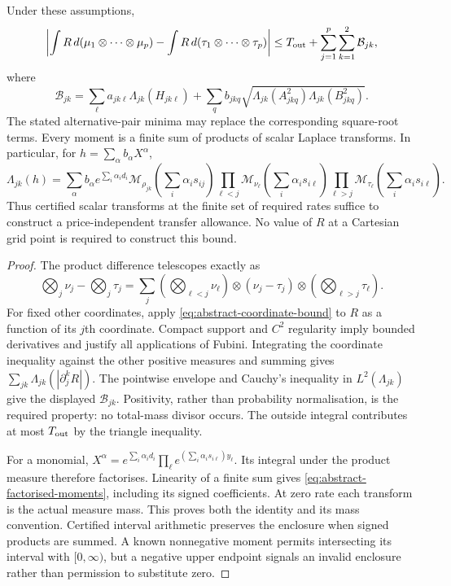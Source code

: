 \begin{proposition}
\label{prop:abstract-transfer-reduction}
Under these assumptions,
\[
 \left|\int R\,d(\mu_1\otimes\cdots\otimes\mu_p)
       -\int R\,d(\tau_1\otimes\cdots\otimes\tau_p)\right|
 \leq T_{\rm out}+\sum_{j=1}^p\sum_{k=1}^2 \mathcal B_{jk},
\]
where
\[
 \mathcal B_{jk}=
 \sum_\ell a_{jk\ell}\Lambda_{jk}(H_{jk\ell})
 +\sum_q b_{jkq}
     \sqrt{\Lambda_{jk}(A_{jkq}^2)\Lambda_{jk}(B_{jkq}^2)}.
\]
The stated alternative-pair minima may replace the corresponding
square-root terms. Every moment is a finite sum of products of scalar
Laplace transforms. In particular, for
$h=\sum_\alpha b_\alpha X^\alpha$,
\begin{equation}
 \Lambda_{jk}(h)=\sum_\alpha b_\alpha
   e^{\sum_i\alpha_id_i}
   \mathcal M_{\rho_{jk}}\!\left(\sum_i\alpha_is_{ij}\right)
   \prod_{\ell<j}\mathcal M_{\nu_\ell}\!\left(\sum_i\alpha_is_{i\ell}\right)
   \prod_{\ell>j}\mathcal M_{\tau_\ell}\!\left(\sum_i\alpha_is_{i\ell}\right).
 \label{eq:abstract-factorised-moments}
\end{equation}
Thus certified scalar transforms at the finite set of required rates
suffice to construct a price-independent transfer allowance. No value of
$R$ at a Cartesian grid point is required to construct this bound.
\end{proposition}
\begin{proof}
The product difference telescopes exactly as
\[
 \bigotimes_j\nu_j-\bigotimes_j\tau_j
 =\sum_j\left(\bigotimes_{\ell<j}\nu_\ell\right)
          \otimes(\nu_j-\tau_j)
          \otimes\left(\bigotimes_{\ell>j}\tau_\ell\right).
\]
For fixed other coordinates, apply
\eqref{eq:abstract-coordinate-bound} to $R$ as a function of its
$j$th coordinate. Compact support and $C^2$ regularity imply bounded
derivatives and justify all applications of Fubini. Integrating the
coordinate inequality against the other positive measures and summing
gives $\sum_{jk}\Lambda_{jk}(|\partial_j^kR|)$. The pointwise envelope
and Cauchy's inequality in $L^2(\Lambda_{jk})$ give the displayed
$\mathcal B_{jk}$. Positivity, rather than probability normalisation,
is the required property: no total-mass divisor occurs. The outside
integral contributes at most $T_{\rm out}$ by the triangle inequality.

For a monomial, $X^\alpha=e^{\sum_i\alpha_id_i}
\prod_\ell e^{(\sum_i\alpha_is_{i\ell})y_\ell}$.
Its integral under the product measure therefore factorises. Linearity
of a finite sum gives \eqref{eq:abstract-factorised-moments}, including
its signed coefficients. At zero rate each transform is the actual
measure mass. This proves both the identity and its mass convention.
Certified interval arithmetic preserves the enclosure when signed
products are summed. A known nonnegative moment permits intersecting
its interval with $[0,\infty)$, but a negative upper endpoint signals
an invalid enclosure rather than permission to substitute zero.
\end{proof}


